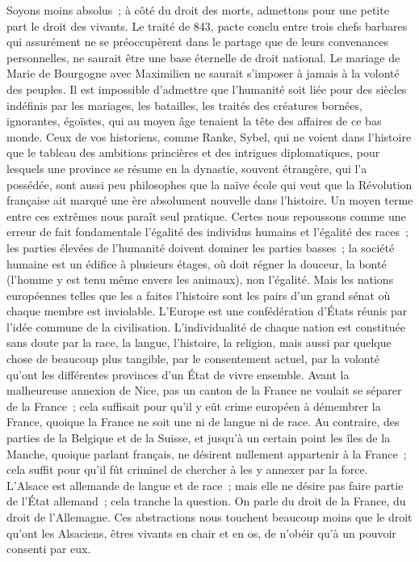 \documentclass[french,twoside]{book} %
\begin{document}
Soyons moins absolus ; à côté du droit des morts, admettons pour une petite part le droit des vivants. Le traité de 843, pacte conclu entre trois chefs barbares qui assurément ne se préoccupèrent dans le partage que de leurs convenances personnelles, ne saurait être une base éternelle de droit national. Le mariage de Marie de Bourgogne avec Maximilien ne saurait s’imposer à jamais à la volonté des peuples. Il est impossible d’admettre que l’humanité soit liée pour des siècles indéfinis par les mariages, les batailles, les traités des créatures bornées, ignorantes, égoïstes, qui au moyen âge tenaient la tête des affaires de ce bas monde. Ceux de vos historiens, comme Ranke, Sybel, qui ne voient dans l’histoire que le tableau des ambitions princières et des intrigues diplomatiques, pour lesquels une province se résume en la dynastie, souvent étrangère, qui l’a possédée, sont aussi peu philosophes que la naïve école qui veut que la Révolution française ait marqué une ère absolument nouvelle dans l’histoire. Un moyen terme entre ces extrêmes nous paraît seul pratique. Certes nous repoussons comme une erreur de fait fondamentale l’égalité des individus humains et l’égalité des races ; les parties élevées de l’humanité doivent dominer les parties basses ; la société humaine est un édifice à plusieurs étages, où doit régner la douceur, la bonté (l’homme y est tenu même envers les animaux), non l’égalité. Mais les nations européennes telles que les a faites l’histoire sont les pairs d’un grand sénat où chaque membre est inviolable. L’Europe est une confédération d’États réunis par l’idée commune de la civilisation. L’individualité de chaque nation est constituée sans doute par la race, la langue, l’histoire, la religion, mais aussi par quelque chose de beaucoup plus tangible, par le consentement actuel, par la volonté qu’ont les différentes provinces d’un État de vivre ensemble. Avant la malheureuse annexion de Nice, pas un canton de la France ne voulait se séparer de la France ; cela suffisait pour qu’il y eût crime européen à démembrer la France, quoique la France ne soit une ni de langue ni de race. Au contraire, des parties de la Belgique et de la Suisse, et jusqu’à un certain point les îles de la Manche, quoique parlant français, ne désirent nullement appartenir à la France ; cela suffit pour qu’il fût criminel de chercher à les y annexer par la force. L’Alsace est allemande de langue et de race ; mais elle ne désire pas faire partie de l’État allemand ; cela tranche la question. On parle du droit de la France, du droit de l’Allemagne. Ces abstractions nous touchent beaucoup moins que le droit qu’ont les Alsaciens, êtres vivants en chair et en os, de n’obéir qu’à un pouvoir consenti par eux.\par
\end{document}
